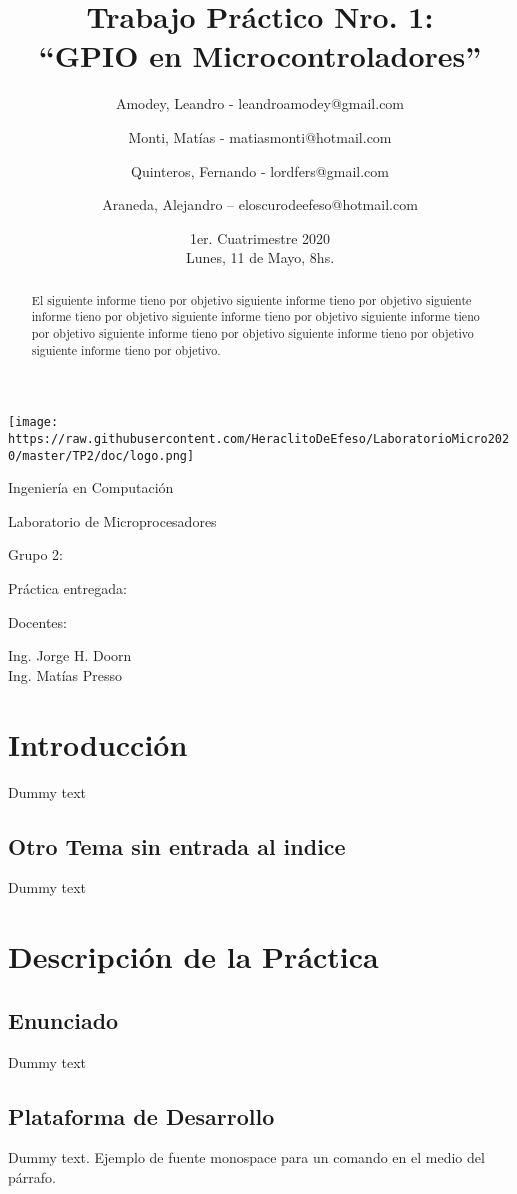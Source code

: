 \documentclass{article}
\title{Trabajo Práctico Nro. 1:\\“GPIO en Microcontroladores”}
\author{Amodey, Leandro - leandroamodey@gmail.com
\and Monti, Matías - matiasmonti@hotmail.com
\and Quinteros, Fernando - lordfers@gmail.com
\and Araneda, Alejandro – eloscurodeefeso@hotmail.com}
\date{1er. Cuatrimestre 2020\\Lunes, 11 de Mayo, 8hs.}
\def\teacher{Ing. Jorge H. Doorn\\Ing. Matías Presso}
\begin{document}
\begin{titlepage}
\makeatletter
\centering
\texttt{[image: https://raw.githubusercontent.com/HeraclitoDeEfeso/LaboratorioMicro2020/master/TP2/doc/logo.png]}\par
{\Large Ingeniería en Computación \par}
\vspace{0.5cm}
{\LARGE Laboratorio de Microprocesadores \par}
\vfill
{\huge \@title \par}
\vfill
Grupo 2:\par
\begin{center}
{\renewcommand{\and}{\par}\@author}    
\end{center}
\vfill
Práctica entregada:\par
\@date
\vfill
Docentes:\par
\teacher
\vspace{1cm}
\makeatother
\end{titlepage}

\renewcommand{\abstractname}{Resumen}
\begin{abstract}
El siguiente informe tieno por objetivo siguiente informe tieno por objetivo siguiente informe tieno por objetivo siguiente informe tieno por objetivo siguiente informe tieno por objetivo siguiente informe tieno por objetivo siguiente informe tieno por objetivo siguiente informe tieno por objetivo.
\end{abstract}

\section{Introducción}
Dummy text

\subsection*{Otro Tema sin entrada al indice}
Dummy text

\section{Descripción de la Práctica}

\subsection{Enunciado}
Dummy text

\subsection{Plataforma de Desarrollo}
Dummy text. Ejemplo de fuente monospace {\ttfamily para un comando} en el medio del párrafo.
\end{document}
